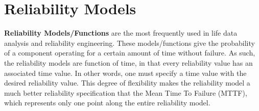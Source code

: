 \section{Reliability Models}
\label{sec:ReliabilityModels}


\newcommand{\aliasRequiredParameterDescription}[1]
{
	\xmlNode{#1}, \xmlDesc{string or float, required parameter}. See above definition.
	If a string was provided, the reliability model would treat it as an input variable that came
	from other entity of RAVEN. In this case, the variable must be listed in the sub-node
	\xmlNode{variables} under \xmlNode{ExternalModel}.
}
\newcommand{\aliasOptionalParameterDescription}[1]
{
	\xmlNode{#1}, \xmlDesc{string or float, optional parameter}. See above definition.
	If a string was provided, the reliability model would treat it as an input variable that came
	from other entity of RAVEN. In this case, the variable must be listed in the sub-node
	\xmlNode{variables} under \xmlNode{ExternalModel}.
	\default{1.}
}

\textbf{Reliability Models/Functions} are the most frequently used in life data analysis
and reliability engineering. These models/functions give the probability of a component
operating for a certain amount of time without failure. As such, the reliability models
are function of time, in that every reliability value has an associated time value. In
other words, one must specify a time value with the desired reliability value. This degree
of flexibility makes the reliability model a much better reliability specification that the
Mean Time To Failure (MTTF), which represents only one point along the entire reliability
model.

